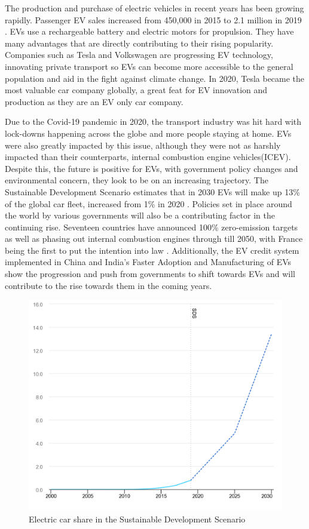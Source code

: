 \documentclass[11pt]{report}
\begin{document}
The production and purchase of electric vehicles in recent years has been growing rapidly. Passenger EV sales increased from 450,000 in 2015 to 2.1 million in 2019 \autocite{bnefEVReport}. EVs use a rechargeable battery and electric motors for propulsion. They have many advantages that are directly contributing to their rising popularity. Companies such as Tesla and Volkswagen are progressing EV technology, innovating private transport so EVs can become more accessible to the general population and aid in the fight against climate change. In 2020, Tesla became the most valuable car company globally, a great feat for EV innovation and production as they are an EV only car company.

Due to the Covid-19 pandemic in 2020, the transport industry was hit hard with lock-downs happening across the globe and more people staying at home. EVs were also greatly impacted by this issue, although they were not as harshly impacted than their counterparts, internal combustion engine vehicles(ICEV)\autocite{IEA2020CovidReport}. Despite this, the future is positive for EVs, with government policy changes and environmental concern, they look to be on an increasing trajectory. The Sustainable Development Scenario estimates that in 2030 EVs will make up 13\% of the global car fleet, increased from 1\% in 2020 \autocite{IEA2020EVReport}.  Policies set in place around the world by various governments will also be a contributing factor in the continuing rise. Seventeen countries have announced 100\% zero-emission targets as well as phasing out internal combustion engines through till 2050, with France being the first to put the intention into law \autocite{IEA2020GlobalEV}. Additionally, the EV credit system implemented in China and India's Faster Adoption and Manufacturing of EVs \autocite{bnefEVReport} show the progression and push from governments to shift towards EVs and will contribute to the rise towards them in the coming years. 

\begin{figure}[h!]
  \centering
  \includegraphics[width=0.55\linewidth]{electric-car-share-in-the-sustainable-development-scenario-2000-2030.png}
  \caption{Electric car share in the Sustainable Development Scenario \autocite{IEA2020EVReport}}
  \label{fig:1}
\end{figure}
\end{document}
